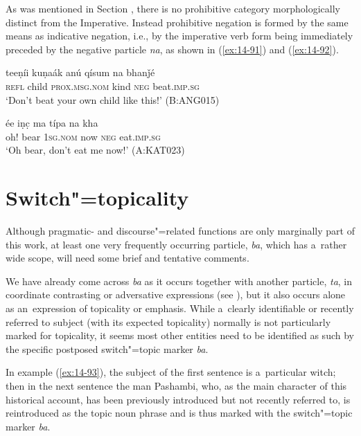As was mentioned in Section , there is no prohibitive category morphologically distinct from the Imperative. Instead prohibitive negation is formed by the same means as indicative negation, i.e., by the imperative verb form being immediately preceded by the negative particle \textit{na}, as shown in (\ref{ex:14-91}) and (\ref{ex:14-92}).

\begin{exe}
\ex
\label{ex:14-91}
\gll teeṇíi kuṇaák anú qísum na bhanǰé \\
\textsc{refl} child \textsc{prox.msg.nom} kind \textsc{neg} beat.\textsc{imp.sg}  \\
\glt `Don't beat your own child like this!' (B:ANG015)

\ex
\label{ex:14-92}
\gll ée iṇc̣ ma típa na kha \\
oh! bear \textsc{1sg.nom} now \textsc{neg} eat.\textsc{imp.sg } \\
\glt `Oh bear, don't eat me now!' (A:KAT023)
\end{exe}

\section{Switch"=topicality}
\label{sec:14-4}


Although pragmatic- and discourse"=related functions are only marginally part of this work, at least one very frequently occurring particle, \textit{ba}, which has a~rather wide scope, will need some brief and tentative comments.



We have already come across \textit{ba} as it occurs together with another particle, \textit{ta}, in coordinate contrasting or adversative expressions (see ), but it also occurs alone as an~expression of topicality or emphasis. While a~clearly identifiable or recently referred to subject (with its expected topicality) normally is not particularly marked for topicality, it seems most other entities need to be identified as such by the specific postposed switch"=topic \citep[149]{andrews2007} marker \textit{ba}.



In example (\ref{ex:14-93}), the subject of the first sentence is a~particular witch; then in the next sentence the man Pashambi, who, as the main character of this historical account, has been previously introduced but not recently referred to, is reintroduced as the topic noun phrase and is thus marked with the switch"=topic marker \textit{ba}.

